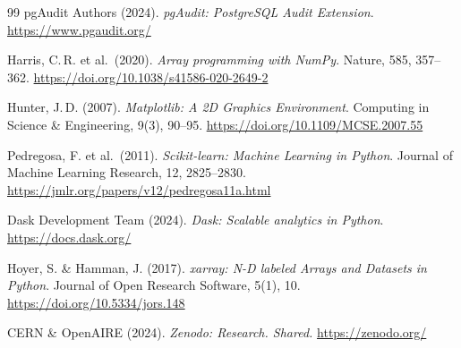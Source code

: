 ﻿\documentclass[12pt,a4paper]{report}
\theoremstyle{definition}
\theoremstyle{remark}
\begin{document}
\begin{thebibliography}{99}
  pgAudit Authors (2024).
  \textit{pgAudit: PostgreSQL Audit Extension}.
  \url{https://www.pgaudit.org/}

  Harris, C.\,R. et al.\ (2020).
  \textit{Array programming with NumPy}.
  Nature, 585, 357--362.
  \url{https://doi.org/10.1038/s41586-020-2649-2}

  Hunter, J.\,D. (2007).
  \textit{Matplotlib: A 2D Graphics Environment}.
  Computing in Science \& Engineering, 9(3), 90--95.
  \url{https://doi.org/10.1109/MCSE.2007.55}

  Pedregosa, F. et al.\ (2011).
  \textit{Scikit-learn: Machine Learning in Python}.
  Journal of Machine Learning Research, 12, 2825--2830.
  \url{https://jmlr.org/papers/v12/pedregosa11a.html}

  Dask Development Team (2024).
  \textit{Dask: Scalable analytics in Python}.
  \url{https://docs.dask.org/}

  Hoyer, S. \& Hamman, J. (2017).
  \textit{xarray: N-D labeled Arrays and Datasets in Python}.
  Journal of Open Research Software, 5(1), 10.
  \url{https://doi.org/10.5334/jors.148}

  CERN \& OpenAIRE (2024).
  \textit{Zenodo: Research. Shared.}
  \url{https://zenodo.org/}

\end{thebibliography}
\end{document}
